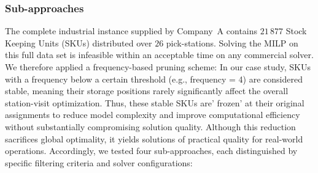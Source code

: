 \documentclass[11pt]{elsarticle}
\begin{document}
\subsubsection{Sub-approaches}

The complete industrial instance supplied by Company~A contains $21\,877$ Stock Keeping Units (SKUs) distributed over $26$ pick-stations.  
Solving the MILP on this full data set is infeasible within an acceptable time on any commercial solver.  
We therefore applied a frequency-based pruning scheme: In our case study, SKUs with a frequency below a certain threshold (e.g., frequency = 4) are considered stable, meaning their storage positions rarely significantly affect the overall station-visit optimization. Thus, these stable SKUs are' frozen' at their original assignments to reduce model complexity and improve computational efficiency without substantially compromising solution quality.  
Although this reduction sacrifices global optimality, it yields solutions of practical quality for real-world operations. Accordingly, we tested four sub-approaches, each distinguished by specific filtering criteria and solver configurations:
\end{document}
